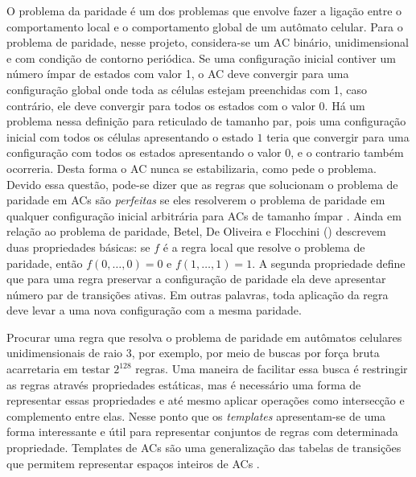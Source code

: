 O problema da paridade é um dos problemas que envolve fazer a ligação entre o comportamento local e o comportamento global de um autômato celular. Para o problema de paridade, nesse projeto, considera-se um AC binário, unidimensional e com condição de contorno periódica. Se uma configuração inicial contiver um número ímpar de estados com valor 1, o AC deve convergir para uma configuração global onde toda as células estejam preenchidas com 1, caso contrário, ele deve convergir para todos os estados com o valor 0. Há um problema nessa definição para  reticulado de tamanho par, pois uma configuração inicial com todos os células apresentando o estado $1$ teria que convergir para uma configuração com todos os estados apresentando o valor $0$, e o contrario também ocorreria. Desta forma o AC nunca se estabilizaria, como pede o problema. Devido essa questão, pode-se dizer que as regras que solucionam o problema de paridade em ACs são \textit{perfeitas} se eles resolverem o problema de paridade em qualquer configuração inicial arbitrária para ACs de tamanho ímpar \cite{Betel2013}. Ainda em relação ao problema de paridade, Betel, De Oliveira e Flocchini (\citeyear{Betel2013}) descrevem duas propriedades básicas: se $f$ é a regra local que resolve o problema de paridade, então $f(0, \dots, 0) = 0$ e $f(1, \dots, 1) = 1$. A segunda propriedade define que para uma regra preservar a configuração de paridade ela deve apresentar número par de transições ativas. Em outras palavras, toda aplicação da regra deve levar a uma nova configuração com a mesma paridade.

Procurar uma regra que resolva o problema de paridade em autômatos celulares unidimensionais de raio 3, por exemplo, por meio de buscas por força bruta acarretaria em testar $2^{128}$ regras. %
Uma maneira de facilitar essa busca é restringir as regras através propriedades estáticas, mas é necessário uma forma de representar essas propriedades e até mesmo aplicar operações como intersecção e complemento entre elas. Nesse ponto que os \textit{templates} apresentam-se de uma forma interessante e útil para representar conjuntos de regras com determinada propriedade. Templates de ACs são uma generalização das tabelas de transições que permitem representar espaços inteiros de ACs \cite{Verardo2014}.%